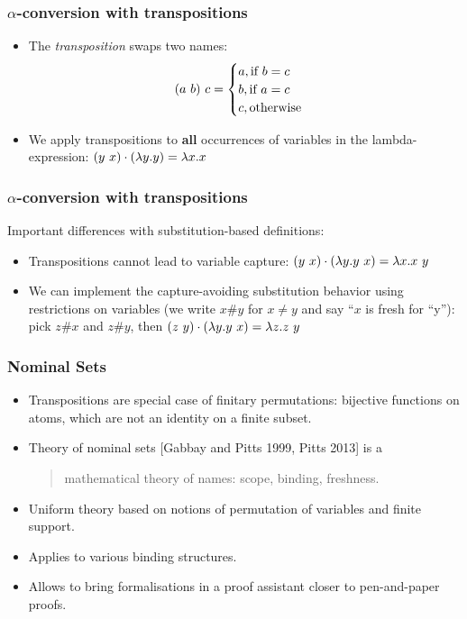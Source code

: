 \documentclass[10pt]{beamer}
\begin{document}
\begin{frame}
  \frametitle{$\alpha$-conversion with transpositions}
  \begin{itemize}
  \item The \emph{transposition} swaps two names:
    \[ (a ~ b)~c =
    \begin{cases}
      a, \text{if } b = c\\
      b, \text{if } a = c\\
      c, \text{otherwise}
    \end{cases} \]
  \item We apply transpositions to \textbf{all} occurrences of
    variables in the lambda-expression:
    $(y ~ x) \cdot (\lambda y.y) = \lambda x.x$
  \end{itemize}
\end{frame}

\begin{frame}
  \frametitle{$\alpha$-conversion with transpositions}
  Important differences with substitution-based definitions:
  \begin{itemize}
  \item Transpositions cannot lead to variable capture:
    $(y ~ x) \cdot (\lambda y.y~x) = \lambda x.x~y$
  \item We can implement the capture-avoiding substitution behavior
    using restrictions on variables (we write $x \# y$ for $x \neq y$
    and say ``$x$ is fresh for ``y''):\\
    \smallskip
    pick $z \# x$ and $z \# y$, then
    $(z ~ y) \cdot (\lambda y.y~x) = \lambda z.z~y$
  \end{itemize}
\end{frame}

\begin{frame}
  \frametitle{Nominal Sets}
  \begin{itemize}
  \item Transpositions are special case of finitary permutations: bijective functions
    on atoms, which are not an identity on a finite subset.
    \pause
  \item Theory of nominal sets [Gabbay and Pitts 1999, Pitts 2013] is a
    \begin{quote}
    mathematical theory of names: scope, binding, freshness.
    \end{quote}
    \pause
    \item Uniform theory based on notions of permutation of variables and finite support.
    \item Applies to various binding structures.
    \item Allows to bring formalisations in a proof assistant closer to pen-and-paper proofs.
    \end{itemize}
\end{frame}
\end{document}
